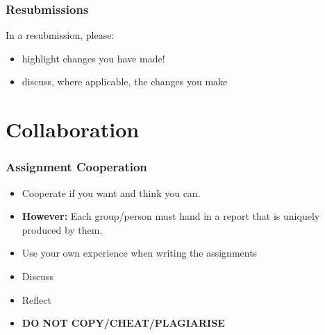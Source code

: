 \documentclass[10pt]{beamer}
\begin{document}
\begin{frame}[t]
\frametitle{Resubmissions}

In a resubmission, please:
\begin{itemize}
\item highlight changes you have made!
\item discuss, where applicable, the changes you make
\end{itemize}
\end{frame}

\section{Collaboration}
\begin{frame}
\frametitle{Assignment Cooperation}
\begin{itemize}
\item Cooperate if you want and think you can.
\item {\bf However:} Each group/person must hand in a report that is uniquely produced by them.

\item Use your own experience when writing the assignments
\item Discuss
\item Reflect

\item {\bf DO NOT COPY/CHEAT/PLAGIARISE}
\end{itemize}
\end{frame}
\end{document}

